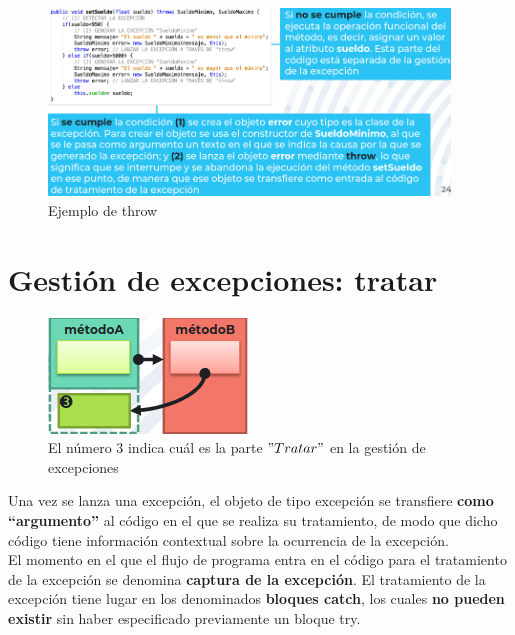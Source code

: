\documentclass{article}
\begin{document}
\begin{figure}[h]
    \centering
    \includegraphics[width=0.95\textwidth]{img-t7/img_984_51.png}
    \caption{Ejemplo de throw}
\end{figure}

\section{Gestión de excepciones: tratar}

\begin{figure}
    \centering
    \includegraphics[width=\linewidth]{img-t7/img_953_39.png}
    \caption{El número 3 indica cuál es la parte $"Tratar"$ en la gestión de excepciones}
\end{figure}

Una vez se lanza una excepción, el objeto de tipo excepción se transfiere \textbf{como “argumento”} al código en el que se realiza su tratamiento, de modo que dicho código tiene información contextual sobre la ocurrencia de la excepción. \\
El momento en el que el flujo de programa entra en el código para el tratamiento de la excepción se denomina \textbf{captura de la excepción}. El tratamiento de la excepción tiene lugar en los denominados \textbf{bloques catch}, los cuales \textbf{no pueden existir} sin haber especificado previamente un bloque try. \\
\end{document}
